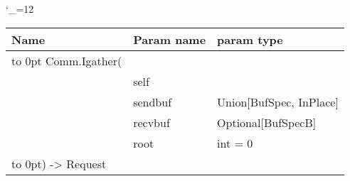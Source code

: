 \begingroup \catcode`\_=12 \tt
\begin{tabular}{lll}
\toprule
\textrm{Name}&\textrm{Param name}&\textrm{param type}\\
\midrule
\hbox to 0pt {Comm.Igather(\hss}\\
& self\\
& sendbuf & Union[BufSpec, InPlace]\\
& recvbuf & Optional[BufSpecB]\\
& root & int = 0\\
\hbox to 0pt{) -> Request\hss}\\
\bottomrule
\end{tabular}
\endgroup

